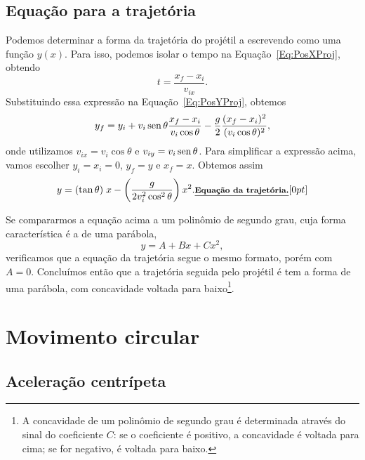 \subsection{Equação para a trajetória}

Podemos determinar a forma da trajetória do projétil a escrevendo como uma função $y(x)$. Para isso, podemos isolar o tempo na Equação~\eqref{Eq:PosXProj}, obtendo
\begin{equation}
  t = \frac{x_f - x_i}{v_{ix}}.
\end{equation}
%
Substituindo essa expressão na Equação~\eqref{Eq:PosYProj}, obtemos
\begin{equation}
  y_f = y_i + v_i\operatorname{sen}\theta \frac{x_f-x_i}{v_i\cos\theta} - \frac{g}{2}\frac{(x_f-x_i)^2}{(v_i\cos\theta)^2},
\end{equation}
%
onde utilizamos $v_{ix} = v_i\cos\theta$ e $v_{iy} = v_i\operatorname{sen}\theta$. Para simplificar a expressão acima, vamos escolher $y_i = x_i = 0$, $y_f = y$ e $x_f = x$. Obtemos assim
\begin{equation}
  y = (\tan\theta) \; x - \left(\frac{g}{2v_i^2\cos^2\theta}\right) x^2. \relax{\footnotesize\emph{\textbf{Equação da trajetória.}}}[0pt]
\end{equation}

Se compararmos a equação acima a um polinômio de segundo grau, cuja forma característica é a de uma parábola, 
\begin{equation}
  y = A + B x + C x^2,
\end{equation}
%
verificamos que a equação da trajetória segue o mesmo formato, porém com $A = 0$. Concluímos então que a trajetória seguida pelo projétil é tem a forma de uma parábola, com concavidade voltada para baixo\footnote{A concavidade de um polinômio de segundo grau é determinada através do sinal do coeficiente $C$: se o coeficiente é positivo, a concavidade é voltada para cima; se for negativo, é voltada para baixo.}.

\section{Movimento circular}
\subsection{Aceleração centrípeta}

